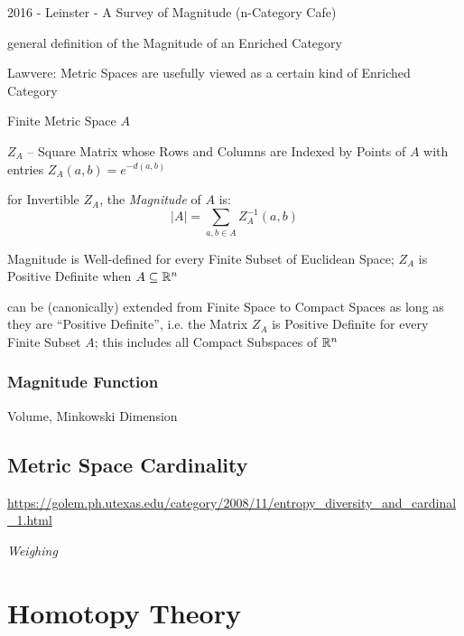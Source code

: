 2016 - Leinster - A Survey of Magnitude (n-Category Cafe) %

general definition of the Magnitude of an Enriched Category %

Lawvere: Metric Spaces are usefully viewed as a certain kind of
Enriched Category

Finite Metric Space $A$

$Z_A$ -- Square Matrix whose Rows and Columns are Indexed by Points of
$A$ with entries $Z_A(a,b) = e^{-d(a,b)}$

for Invertible $Z_A$, the \emph{Magnitude} of $A$ is:
\[
  |A| = \sum_{a,b \in A} Z^{-1}_A (a,b)
\]

Magnitude is Well-defined for every Finite Subset of Euclidean Space;
$Z_A$ is Positive Definite when $A \subseteq \mathbb{R}^n$

can be (canonically) extended from Finite Space to Compact Spaces as
long as they are ``Positive Definite'', i.e. the Matrix $Z_A$ is
Positive Definite for every Finite Subset $A$; this includes all
Compact Subspaces of $\mathbb{R}^n$



\subsubsection{Magnitude Function}\label{sec:magnitude_function}

Volume, Minkowski Dimension



\subsection{Metric Space Cardinality}\label{sec:metric_cardinality}

\url{https://golem.ph.utexas.edu/category/2008/11/entropy_diversity_and_cardinal_1.html}

\emph{Weighing}



\section{Homotopy Theory}\label{sec:homotopy_theory}

